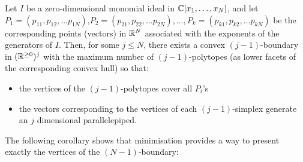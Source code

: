 \documentclass[11pt,a4paper,leqno,noamsfonts]{amsart}
\numberwithin{equation}{section}
\begin{document}
\begin{prop} \label{prop: simplexDecomposition}
    Let $I$ be a zero-dimensional monomial ideal in ${\mathbb{C}}[x_1,\ldots,x_N]$, and let $P_1=(p_{11},p_{12},\ldots p_{1N})$,$P_2=(p_{21},p_{22},\ldots p_{2N}),\ldots,P_k=(p_{k1},p_{k2},\ldots p_{kN})$ be the corresponding points (vectors) in ${\mathbb{R}}^N$ associated with the exponents of the generators of $I$. Then, for some $j\leq N$, there exists a convex $(j-1)$-boundary in  $({\mathbb{R}}^{\geq 0})^{j}$ with the maximum number of $(j-1)$-polytopes (as lower facets of the corresponding convex hull) 
so that:
\begin{itemize}
\item the vertices of the $(j-1)$-polytopes cover all $P_i$'s

    \item the vectors corresponding to the vertices of each $(j-1)$-simplex generate an $j$ dimensional parallelepiped.
\end{itemize}

\end{prop}




The following corollary shows that minimisation provides a way to present exactly the vertices of the $(N-1)$-boundary:
\end{document}
